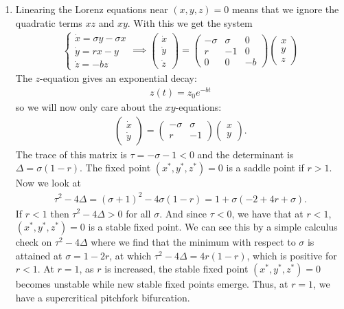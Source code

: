 \documentclass{article}
\theoremstyle{definition}
\begin{document}
\begin{enumerate}[label=(\alph*)]
	
	\item Linearing the Lorenz equations near $(x,y,z)=0$ means that we ignore the quadratic terms $xz$ and $xy$. With this we get the system
	\begin{align*}
	\begin{cases}
	\dot x = \sigma y - \sigma x \\ 
	\dot y = r x - y \\
	\dot z = -bz 
	\end{cases} \implies 
	\begin{pmatrix}
	\dot x \\ \dot y \\ \dot z 
	\end{pmatrix}
	= 
	\begin{pmatrix}
	-\sigma & \sigma & 0 \\ r & -1 & 0 \\ 0 & 0 & -b
	\end{pmatrix}\begin{pmatrix}
	x\\y\\z
	\end{pmatrix}
	\end{align*}
	The $z$-equation gives an exponential decay:
	\begin{align*}
	\boxed{z(t) = z_0 e^{-bt}}
	\end{align*}
	so we will now only care about the $xy$-equations:
	\begin{align*}
	\begin{pmatrix}
	\dot x \\ \dot y 
	\end{pmatrix}
	= 
	\begin{pmatrix}
	-\sigma & \sigma \\ r & -1
	\end{pmatrix}\begin{pmatrix}
	x\\y
	\end{pmatrix}.
	\end{align*}
	The trace of this matrix is $\tau = -\sigma - 1 < 0$ and the determinant is $\Delta = \sigma(1-r)$. The fixed point $(x^*,y^*,z^*)=0$ is a saddle point if $r>1$. Now we look at 
	\begin{align*}
	\tau^2 - 4\Delta = (\sigma + 1)^2 - 4\sigma(1-r) = 1 + \sigma(-2 + 4r + \sigma).
	\end{align*}
	If $r < 1$ then $\tau^2 - 4 \Delta >0$ for all $\sigma$. And since $\tau < 0$, we have that at $r < 1$, $(x^*,y^*, z^*) = 0$ is a stable fixed point. We can see this by a simple calculus check on $\tau^2 - 4\Delta$ where we find that the minimum with respect to $\sigma$ is attained at $\sigma = 1-2r$, at which $\tau^2 - 4\Delta = 4r(1-r)$, which is positive for $r<1$. At $r=1$, as $r$ is increased, the stable fixed point $(x^*,y^*,z^*)=0$ becomes unstable while new stable fixed points emerge. Thus, at $r=1$, we have a supercritical pitchfork bifurcation. 
\end{enumerate}
\end{document}
